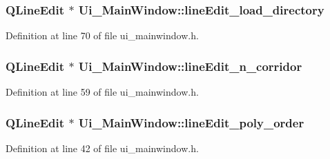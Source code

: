 \subsubsection[{\texorpdfstring{line\+Edit\+\_\+load\+\_\+directory}{lineEdit_load_directory}}]{\setlength{\rightskip}{0pt plus 5cm}Q\+Line\+Edit $\ast$ Ui\+\_\+\+Main\+Window\+::line\+Edit\+\_\+load\+\_\+directory}\hypertarget{class_ui___main_window_aa169d6e83003b698884c786413bfce46}{}\label{class_ui___main_window_aa169d6e83003b698884c786413bfce46}


Definition at line 70 of file ui\+\_\+mainwindow.\+h.

\subsubsection[{\texorpdfstring{line\+Edit\+\_\+n\+\_\+corridor}{lineEdit_n_corridor}}]{\setlength{\rightskip}{0pt plus 5cm}Q\+Line\+Edit $\ast$ Ui\+\_\+\+Main\+Window\+::line\+Edit\+\_\+n\+\_\+corridor}\hypertarget{class_ui___main_window_a87f1c3679fff12e451234f3f6cf1a620}{}\label{class_ui___main_window_a87f1c3679fff12e451234f3f6cf1a620}


Definition at line 59 of file ui\+\_\+mainwindow.\+h.

\subsubsection[{\texorpdfstring{line\+Edit\+\_\+poly\+\_\+order}{lineEdit_poly_order}}]{\setlength{\rightskip}{0pt plus 5cm}Q\+Line\+Edit $\ast$ Ui\+\_\+\+Main\+Window\+::line\+Edit\+\_\+poly\+\_\+order}\hypertarget{class_ui___main_window_ad06eaa4cbcd0eddeda7136d30b0f9fef}{}\label{class_ui___main_window_ad06eaa4cbcd0eddeda7136d30b0f9fef}


Definition at line 42 of file ui\+\_\+mainwindow.\+h.

